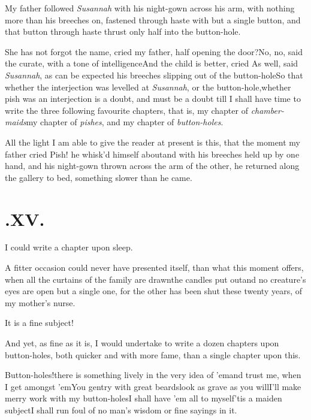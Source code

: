 \documentclass{article}
\begin{document}
My father followed \textit{Susannah} with his night-gown across
his arm, with nothing more than his breeches on, fastened through
haste with but a single button, and that button through haste
thrust only half into the button-hole.

\tsh She has not forgot the name, cried my father, half
opening the door?\tsk No,
no, said the curate, with a tone of intelligence\tsk And
the child is better, cried  As well, said \textit{Susannah}, as
can be expect\-ed\tsk {} his
breeches slipping out of the button-hole\tsk So that whether
the interjection was levelled at \textit{Susannah}, or the
button-hole,\tsk whether pish was an interjection  is a doubt, and must be a
doubt till I shall have time to write the three following
favourite chapters, that is, my chapter of
\textit{chamber-maids}\tsk my chapter of \textit{pishes},
and my chapter of \textit{button-holes}.

All the light I am able to give the reader at present is this,
that the moment my father cried Pish! he whisk’d himself
about\tsk and with his breeches held up by one hand, and his
night-gown thrown across the arm of the other, he returned along the
gallery to bed, something slower than he came.

\medskip
\section{.\enspace XV.}

 I could write a chapter upon\break
sleep.

A fitter occasion could never have presented itself, than what
this moment offers, when all the curtains of the family are
drawn\tsk the candles put out\tsk and no creature’s eyes
are open but a single one, for the other has been shut these twenty
years, of my mother’s nurse.

It is a fine subject!

And yet, as fine as it is, I would undertake to write a dozen chapters upon
button-holes, both quicker and with\break
more fame, than a single
chapter upon this.

Button-holes!\tsh there is something\break
lively in the very idea of ’em\tsk and trust\break
me, when I get amongst ’em\tsk You\break
gentry with great beards\tsh look as\break
grave as you will\tsh I’ll make merry\break
work with my button-holes\tsk I shall have
’em all to myself\tsk ’tis a maiden subject\break\tsk I shall run
foul of no man’s wisdom or fine sayings in it.
\end{document}
